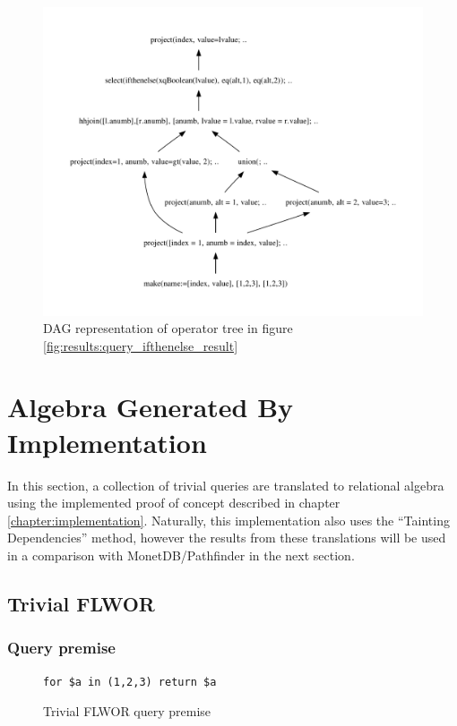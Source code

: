 \begin{figure}[!htp]
\begin{center}
  \includegraphics[width=1.0\textwidth]{img/graphs/ifthenelse_dag}
  \caption{DAG representation of operator tree in figure
  \ref{fig:results:query_ifthenelse_result}}
  \label{fig:results:query_ifthenelse_result_dag}
\end{center}
\end{figure}

\newpage

\section{Algebra Generated By Implementation}
\label{sect:result:implementation_algebra}
In this section, a collection of trivial queries are translated to relational
algebra using the implemented proof of concept described in chapter
\ref{chapter:implementation}. Naturally, this implementation also uses the
``Tainting Dependencies'' method, however the results from these translations
will be used in a comparison with MonetDB/Pathfinder in the next section.

\subsection{Trivial FLWOR}
\label{sect:results:algebra:generated:trivial_flwor}
\subsubsection{Query premise}
\begin{figure}[!htp]
\begin{center}
\begin{Verbatim}
for $a in (1,2,3) return $a
\end{Verbatim}
  \caption{Trivial FLWOR query premise}
  \label{fig:results:query_trivial_flwor}
\end{center}
\end{figure}

